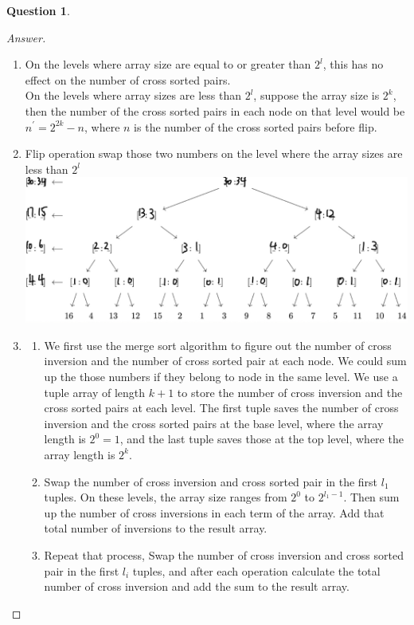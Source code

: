 \documentclass{article}
\theoremstyle{plain}
\newtheorem{question}{Question}
\newenvironment{answer}[1][Answer]
    {\begin{proof}[#1]{$ $}\renewcommand\qedsymbol{$\vartriangle$}}
    {\end{proof}}
\begin{document}
\begin{question}
\end{question}
\begin{answer}
    \begin{enumerate}
        \item
        On the levels where array size are equal to or greater than $2^l$, this has no effect on the number of cross sorted pairs. \\
        On the levels where array sizes are less than $2^l$, suppose the array size is $2^k$, then the number of the cross sorted pairs in each node on that level would be $n^\prime = 2^{2k} - n$, where $n$ is the number of the cross sorted pairs before flip.
        \item
        Flip operation swap those two numbers on the level where the array sizes are less than $2^l$ \\

        \includegraphics[width=0.9\columnwidth]{Q6_2.jpeg}
        \item
        \begin{enumerate}
            \item
            We first use the merge sort algorithm to figure out the number of cross inversion and the number of cross sorted pair at each node. We could sum up the those numbers if they belong to node in the same level. We use a tuple array of length $k + 1$ to store the number of cross inversion and the cross sorted pairs at each level. The first tuple saves the number of cross inversion and the cross sorted pairs at the base level, where the array length is $2^0 = 1$, and the last tuple saves those at the top level, where the array length is $2^k$.
            \item
            Swap the number of cross inversion and cross sorted pair in the first $l_1$ tuples. On these levels, the array size ranges from $2^0$ to $2^{l_1 - 1}$. Then sum up the number of cross inversions in each term of the array. Add that total number of inversions to the result array.
            \item
            Repeat that process, Swap the number of cross inversion and cross sorted pair in the first $l_i$ tuples, and after each operation calculate the total number of cross inversion and add the sum to the result array.
        \end{enumerate}
    \end{enumerate}
\end{answer}
\end{document}
